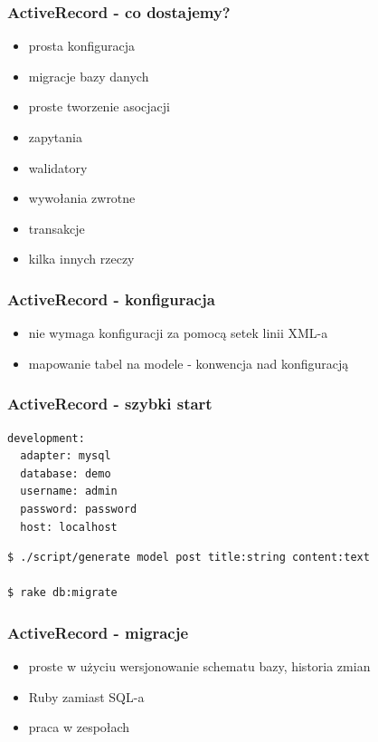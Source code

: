 \documentclass[12t]{beamer}
\begin{document}
\begin{frame}
  \frametitle{ActiveRecord - co dostajemy?}
  \begin{itemize}
  \item prosta konfiguracja
  \item migracje bazy danych
  \item proste tworzenie asocjacji
  \item zapytania
  \item walidatory
  \item wywołania zwrotne
  \item transakcje
  \item kilka innych rzeczy
  \end{itemize}
\end{frame}

\begin{frame}
  \frametitle{ActiveRecord - konfiguracja}
  \begin{itemize}
  \item nie wymaga konfiguracji za pomocą setek linii XML-a
  \item mapowanie tabel na modele - konwencja nad konfiguracją
  \end{itemize}
\end{frame}

\begin{frame}[fragile]
  \frametitle{ActiveRecord - szybki start}
\begin{verbatim}
development:
  adapter: mysql
  database: demo
  username: admin
  password: password
  host: localhost
\end{verbatim}
\begin{verbatim}
$ ./script/generate model post title:string content:text

$ rake db:migrate
\end{verbatim}
  
\end{frame}

\begin{frame}
  \frametitle{ActiveRecord - migracje}
  \begin{itemize}
  \item proste w użyciu wersjonowanie schematu bazy, historia zmian
  \item Ruby zamiast SQL-a
  \item praca w zespołach
  \end{itemize}
\end{frame}
\end{document}
